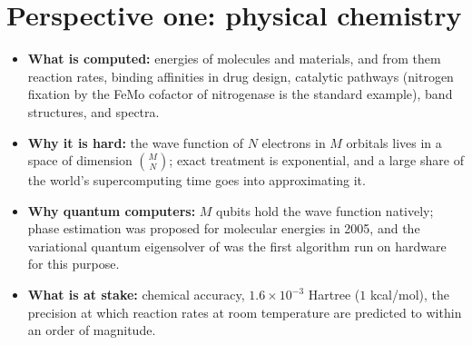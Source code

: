 \documentclass[overheadsbeamer.tex]{subfiles}
\begin{document}
\section{Perspective one: physical chemistry}

\begin{frame}
\begin{itemize}\setlength\itemsep{0.3em}
    \item \textbf{What is computed:} energies of molecules and materials, and from them reaction rates, binding affinities in drug design, catalytic pathways (nitrogen fixation by the FeMo cofactor of nitrogenase is the standard example), band structures, and spectra.
    \item \textbf{Why it is hard:} the wave function of $N$ electrons in $M$ orbitals lives in a space of dimension $\binom{M}{N}$; exact treatment is exponential, and a large share of the world's supercomputing time goes into approximating it.
    \item \textbf{Why quantum computers:} $M$ qubits hold the wave function natively; phase estimation was proposed for molecular energies in 2005, and the variational quantum eigensolver of \citet{peruzzo2014variational} was the first algorithm run on hardware for this purpose.
    \item \textbf{What is at stake:} chemical accuracy, $1.6\times10^{-3}$ Hartree ($1$ kcal/mol), the precision at which reaction rates at room temperature are predicted to within an order of magnitude.
\end{itemize}
\end{frame}
\end{document}

